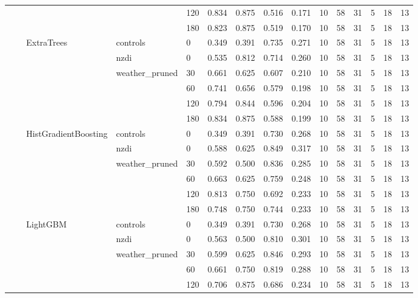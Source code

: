 \begin{longtable}{lllllrrrrrrrrrr}
 &  &  &  & 120 & 0.834 & 0.875 & 0.516 & 0.171 & 10 & 58 & 31 & 5 & 18 & 13 \\
 &  &  &  & 180 & 0.823 & 0.875 & 0.519 & 0.170 & 10 & 58 & 31 & 5 & 18 & 13 \\
\cline{3-15} \cline{4-15}
 &  & \multirow[t]{6}{*}{ExtraTrees} & controls & 0 & 0.349 & 0.391 & 0.735 & 0.271 & 10 & 58 & 31 & 5 & 18 & 13 \\
\cline{4-15}
 &  &  & nzdi & 0 & 0.535 & 0.812 & 0.714 & 0.260 & 10 & 58 & 31 & 5 & 18 & 13 \\
\cline{4-15}
 &  &  & \multirow[t]{4}{*}{weather_pruned} & 30 & 0.661 & 0.625 & 0.607 & 0.210 & 10 & 58 & 31 & 5 & 18 & 13 \\
 &  &  &  & 60 & 0.741 & 0.656 & 0.579 & 0.198 & 10 & 58 & 31 & 5 & 18 & 13 \\
 &  &  &  & 120 & 0.794 & 0.844 & 0.596 & 0.204 & 10 & 58 & 31 & 5 & 18 & 13 \\
 &  &  &  & 180 & 0.834 & 0.875 & 0.588 & 0.199 & 10 & 58 & 31 & 5 & 18 & 13 \\
\cline{3-15} \cline{4-15}
 &  & \multirow[t]{6}{*}{HistGradientBoosting} & controls & 0 & 0.349 & 0.391 & 0.730 & 0.268 & 10 & 58 & 31 & 5 & 18 & 13 \\
\cline{4-15}
 &  &  & nzdi & 0 & 0.588 & 0.625 & 0.849 & 0.317 & 10 & 58 & 31 & 5 & 18 & 13 \\
\cline{4-15}
 &  &  & \multirow[t]{4}{*}{weather_pruned} & 30 & 0.592 & 0.500 & 0.836 & 0.285 & 10 & 58 & 31 & 5 & 18 & 13 \\
 &  &  &  & 60 & 0.663 & 0.625 & 0.759 & 0.248 & 10 & 58 & 31 & 5 & 18 & 13 \\
 &  &  &  & 120 & 0.813 & 0.750 & 0.692 & 0.233 & 10 & 58 & 31 & 5 & 18 & 13 \\
 &  &  &  & 180 & 0.748 & 0.750 & 0.744 & 0.233 & 10 & 58 & 31 & 5 & 18 & 13 \\
\cline{3-15} \cline{4-15}
 &  & \multirow[t]{6}{*}{LightGBM} & controls & 0 & 0.349 & 0.391 & 0.730 & 0.268 & 10 & 58 & 31 & 5 & 18 & 13 \\
\cline{4-15}
 &  &  & nzdi & 0 & 0.563 & 0.500 & 0.810 & 0.301 & 10 & 58 & 31 & 5 & 18 & 13 \\
\cline{4-15}
 &  &  & \multirow[t]{4}{*}{weather_pruned} & 30 & 0.599 & 0.625 & 0.846 & 0.293 & 10 & 58 & 31 & 5 & 18 & 13 \\
 &  &  &  & 60 & 0.661 & 0.750 & 0.819 & 0.288 & 10 & 58 & 31 & 5 & 18 & 13 \\
 &  &  &  & 120 & 0.706 & 0.875 & 0.686 & 0.234 & 10 & 58 & 31 & 5 & 18 & 13 \\

\end{longtable}
